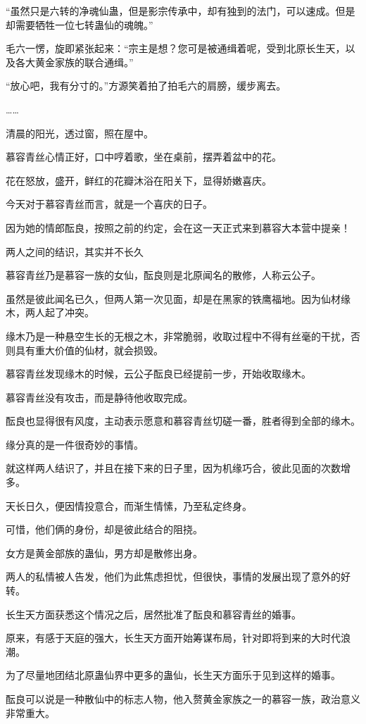 \begin{this_body}
“虽然只是六转的净魂仙蛊，但是影宗传承中，却有独到的法门，可以速成。但是却需要牺牲一位七转蛊仙的魂魄。”

毛六一愣，旋即紧张起来：“宗主是想？您可是被通缉着呢，受到北原长生天，以及各大黄金家族的联合通缉。”

“放心吧，我有分寸的。”方源笑着拍了拍毛六的肩膀，缓步离去。

……

清晨的阳光，透过窗，照在屋中。

慕容青丝心情正好，口中哼着歌，坐在桌前，摆弄着盆中的花。

花在怒放，盛开，鲜红的花瓣沐浴在阳关下，显得娇嫩喜庆。

今天对于慕容青丝而言，就是一个喜庆的日子。

因为她的情郎酝良，按照之前的约定，会在这一天正式来到慕容大本营中提亲！

两人之间的结识，其实并不长久

慕容青丝乃是慕容一族的女仙，酝良则是北原闻名的散修，人称云公子。

虽然是彼此闻名已久，但两人第一次见面，却是在黑家的铁鹰福地。因为仙材缘木，两人起了冲突。

缘木乃是一种悬空生长的无根之木，非常脆弱，收取过程中不得有丝毫的干扰，否则具有重大价值的仙材，就会损毁。

慕容青丝发现缘木的时候，云公子酝良已经提前一步，开始收取缘木。

慕容青丝没有攻击，而是静待他收取完成。

酝良也显得很有风度，主动表示愿意和慕容青丝切磋一番，胜者得到全部的缘木。

缘分真的是一件很奇妙的事情。

就这样两人结识了，并且在接下来的日子里，因为机缘巧合，彼此见面的次数增多。

天长日久，便因情投意合，而渐生情愫，乃至私定终身。

可惜，他们俩的身份，却是彼此结合的阻挠。

女方是黄金部族的蛊仙，男方却是散修出身。

两人的私情被人告发，他们为此焦虑担忧，但很快，事情的发展出现了意外的好转。

长生天方面获悉这个情况之后，居然批准了酝良和慕容青丝的婚事。

原来，有感于天庭的强大，长生天方面开始筹谋布局，针对即将到来的大时代浪潮。

为了尽量地团结北原蛊仙界中更多的蛊仙，长生天方面乐于见到这样的婚事。

酝良可以说是一种散仙中的标志人物，他入赘黄金家族之一的慕容一族，政治意义非常重大。


\end{this_body}

